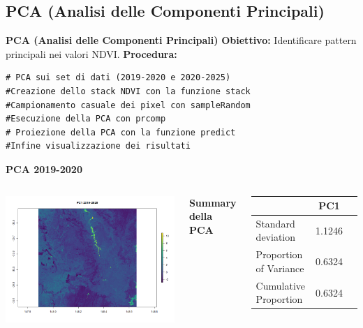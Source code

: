 \documentclass{beamer}
\begin{document}
\subsection{PCA (Analisi delle Componenti Principali)}

\begin{frame}[fragile]{\textbf{PCA (Analisi delle Componenti Principali)}}
\textbf{Obiettivo:} Identificare pattern principali nei valori NDVI.
\newline
\newline
\textbf{Procedura:}
\begin{lstlisting}
# PCA sui set di dati (2019-2020 e 2020-2025)
#Creazione dello stack NDVI con la funzione stack
#Campionamento casuale dei pixel con sampleRandom
#Esecuzione della PCA con prcomp
# Proiezione della PCA con la funzione predict
#Infine visualizzazione dei risultati
\end{lstlisting}
\end{frame}

\begin{frame}{\textbf{PCA 2019-2020}}
\begin{columns}
    \centering
    \includegraphics[width=\textwidth]{PCA_PC1_2019_2020.png}
    
    \centering
    \textbf{Summary della PCA}
    \begin{table}
        \centering
        \begin{tabular}{lcc}
            \toprule
            & PC1 \\
            \midrule
            Standard deviation     & 1.1246  \\
            Proportion of Variance & 0.6324 \\
            Cumulative Proportion  & 0.6324 \\
            \bottomrule
        \end{tabular}
    \end{table}
\end{columns}
\end{frame}
\end{document}

